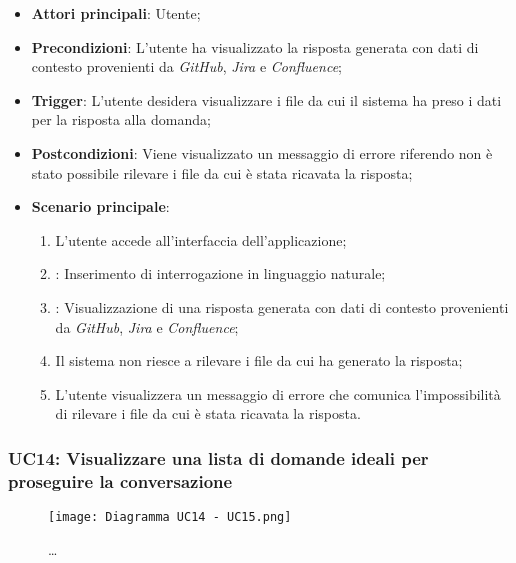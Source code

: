 \begin{itemize}
    \item \textbf{Attori principali}: Utente;
    \item \textbf{Precondizioni}: L'utente ha visualizzato la risposta generata con dati di contesto provenienti da \emph{GitHub}, \emph{Jira} e \emph{Confluence};
    \item \textbf{Trigger}: L'utente desidera visualizzare i file da cui il sistema ha preso i dati per la risposta alla domanda;
    \item \textbf{Postcondizioni}: Viene visualizzato un messaggio di errore riferendo non è stato possibile rilevare i file da cui è stata ricavata la risposta;
    \item \textbf{Scenario principale}: 
    \begin{enumerate}
        \item L'utente accede all'interfaccia dell'applicazione;
        \item {}: Inserimento di interrogazione in linguaggio naturale;
        \item {}: Visualizzazione di una risposta generata con dati di contesto provenienti da \emph{GitHub}, \emph{Jira} e \emph{Confluence};
        \item Il sistema non riesce a rilevare i file da cui ha generato la risposta;
        \item L'utente visualizzera un messaggio di errore che comunica l'impossibilità di rilevare i file da cui è stata ricavata la risposta.
    \end{enumerate}
\end{itemize}


\newpage
\hypertarget{UC14}{}
\subsubsection{UC14: Visualizzare una lista di domande ideali per proseguire la conversazione}

\begin{figure}[h]
    \centering
    \texttt{[image: Diagramma UC14 - UC15.png]}
    \caption{\dots}
\end{figure}

